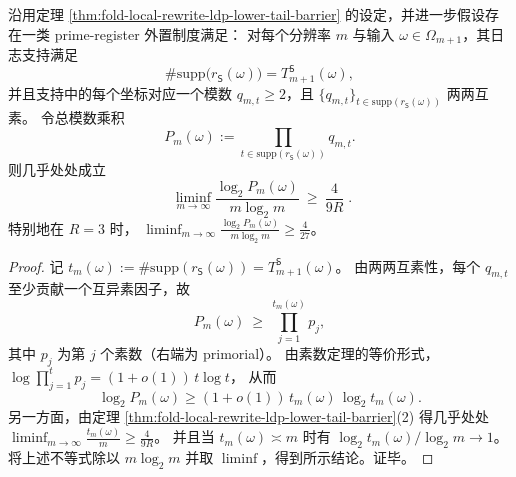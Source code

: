 \begin{corollary}\label{cor:fold-prime-register-bitlength-omega-mlogm}
沿用定理 \ref{thm:fold-local-rewrite-ldp-lower-tail-barrier} 的设定，并进一步假设存在一类 prime-register 外置制度满足：
对每个分辨率 \(m\) 与输入 \(\omega\in\Omega_{m+1}\)，其日志支持满足
\[
\#\mathrm{supp}\bigl(r_{\mathsf S}(\omega)\bigr)=T_{m+1}^{\mathsf S}(\omega),
\]
并且支持中的每个坐标对应一个模数 \(q_{m,t}\ge 2\)，且 \(\{q_{m,t}\}_{t\in \mathrm{supp}(r_{\mathsf S}(\omega))}\) 两两互素。
令总模数乘积
\[
P_m(\omega):=\prod_{t\in \mathrm{supp}(r_{\mathsf S}(\omega))} q_{m,t}.
\]
则几乎处处成立
\[
\boxed{\;
\liminf_{m\to\infty}\frac{\log_2 P_m(\omega)}{m\log_2 m}\ \ge\ \frac{4}{9R}\; }.
\]
特别地在 \(R=3\) 时，
\(
\liminf_{m\to\infty}\frac{\log_2 P_m(\omega)}{m\log_2 m}\ge \frac{4}{27}
\)。
\end{corollary}
\begin{proof}
记 \(t_m(\omega):=\#\mathrm{supp}(r_{\mathsf S}(\omega))=T_{m+1}^{\mathsf S}(\omega)\)。
由两两互素性，每个 \(q_{m,t}\) 至少贡献一个互异素因子，故
\[
P_m(\omega)\ \ge\ \prod_{j=1}^{t_m(\omega)} p_j,
\]
其中 \(p_j\) 为第 \(j\) 个素数（右端为 primorial）。
由素数定理的等价形式，
\(
\log\prod_{j=1}^{t}p_j=(1+o(1))\,t\log t
\)，
从而
\[
\log_2 P_m(\omega)
\ge (1+o(1))\,t_m(\omega)\,\log_2 t_m(\omega).
\]
另一方面，由定理 \ref{thm:fold-local-rewrite-ldp-lower-tail-barrier}(2) 得几乎处处
\(
\liminf_{m\to\infty}\frac{t_m(\omega)}{m}\ge \frac{4}{9R}
\)。
并且当 \(t_m(\omega)\asymp m\) 时有 \(\log_2 t_m(\omega)/\log_2 m\to 1\)。
将上述不等式除以 \(m\log_2 m\) 并取 \(\liminf\)，得到所示结论。证毕。
\end{proof}

